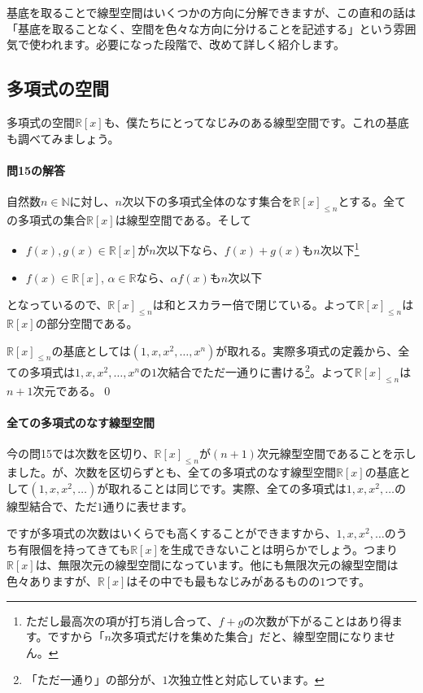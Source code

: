 基底を取ることで線型空間はいくつかの方向に分解できますが、この直和の話は「基底を取ることなく、空間を色々な方向に分けることを記述する」という雰囲気で使われます。必要になった段階で、改めて詳しく紹介します。

\subsection{多項式の空間}

多項式の空間$\mathbb{R}[x]$も、僕たちにとってなじみのある線型空間です。これの基底も調べてみましょう。

\paragraph{問15の解答}
自然数$n\in\mathbb{N}$に対し、$n$次以下の多項式全体のなす集合を$\mathbb{R}[x]_{\leq n}$とする。全ての多項式の集合$\mathbb{R}[x]$は線型空間である。そして
\begin{itemize}
\item $f(x), g(x) \in\mathbb{R}[x]$が$n$次以下なら、$f(x) + g(x)$も$n$次以下\footnote{ただし最高次の項が打ち消し合って、$f + g$の次数が下がることはあり得ます。ですから「$n$次多項式だけを集めた集合」だと、線型空間になりません。}
\item $f(x) \in \mathbb{R}[x]$, $\alpha \in \mathbb{R}$なら、$\alpha f(x)$も$n$次以下
\end{itemize}
となっているので、$\mathbb{R}[x]_{\leq n}$は和とスカラー倍で閉じている。よって$\mathbb{R}[x]_{\leq n}$は$\mathbb{R}[x]$の部分空間である。

$\mathbb{R}[x]_{\leq n}$の基底としては$(1, x, x^2, \ldots, x^n)$が取れる。実際多項式の定義から、全ての多項式は$1, x, x^2, \ldots, x^n$の$1$次結合でただ一通りに書ける\footnote{「ただ一通り」の部分が、$1$次独立性と対応しています。}。よって$\mathbb{R}[x]_{\leq n}$は$n + 1$次元である。\qed

\paragraph{全ての多項式のなす線型空間}

今の問15では次数を区切り、$\mathbb{R}[x]_{\leq n}$が$(n + 1)$次元線型空間であることを示しました。が、次数を区切らずとも、全ての多項式のなす線型空間$\mathbb{R}[x]$の基底として$(1, x, x^2, \ldots)$が取れることは同じです。実際、全ての多項式は$1, x, x^2, \ldots$の線型結合で、ただ$1$通りに表せます。

ですが多項式の次数はいくらでも高くすることができますから、$1, x, x^2, \ldots$のうち有限個を持ってきても$\mathbb{R}[x]$を生成できないことは明らかでしょう。つまり$\mathbb{R}[x]$は、無限次元の線型空間になっています。他にも無限次元の線型空間は色々ありますが、$\mathbb{R}[x]$はその中でも最もなじみがあるものの$1$つです。

